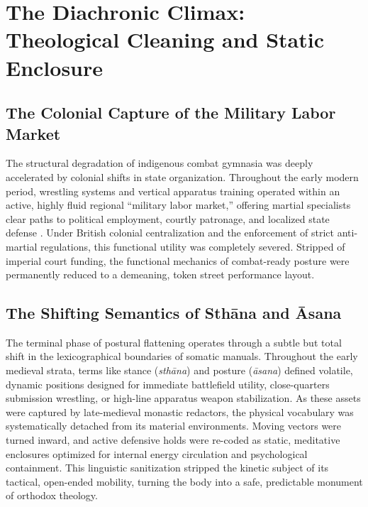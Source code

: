 \documentclass[11pt,twoside,letterpaper]{article}
\begin{document}
\section{The Diachronic Climax: Theological Cleaning and Static Enclosure}

\subsection{The Colonial Capture of the Military Labor Market}
The structural degradation of indigenous combat gymnasia was deeply accelerated by colonial shifts in state organization. Throughout the early modern period, wrestling systems and vertical apparatus training operated within an active, highly fluid regional “military labor market,” offering martial specialists clear paths to political employment, courtly patronage, and localized state defense \citep{Thomas2025}. Under British colonial centralization and the enforcement of strict anti-martial regulations, this functional utility was completely severed. Stripped of imperial court funding, the functional mechanics of combat-ready posture were permanently reduced to a demeaning, token street performance layout.

\subsection{The Shifting Semantics of Sth\={a}na and \={A}sana}
The terminal phase of postural flattening operates through a subtle but total shift in the lexicographical boundaries of somatic manuals. Throughout the early medieval strata, terms like stance (\textit{sth\={a}na}) and posture (\textit{\={a}sana}) defined volatile, dynamic positions designed for immediate battlefield utility, close-quarters submission wrestling, or high-line apparatus weapon stabilization. As these assets were captured by late-medieval monastic redactors, the physical vocabulary was systematically detached from its material environments. Moving vectors were turned inward, and active defensive holds were re-coded as static, meditative enclosures optimized for internal energy circulation and psychological containment. This linguistic sanitization stripped the kinetic subject of its tactical, open-ended mobility, turning the body into a safe, predictable monument of orthodox theology.
\end{document}
